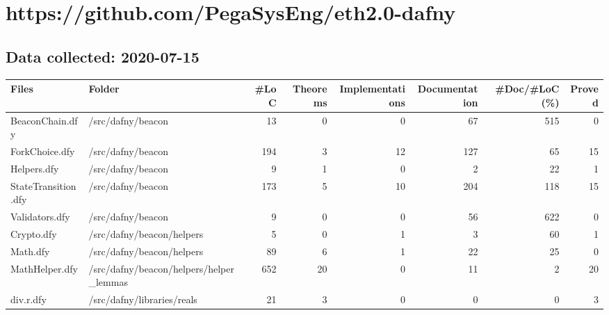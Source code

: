 \documentclass[a4paper, 12pt]{article}
\begin{document}
\section*{https://github.com/PegaSysEng/eth2.0-dafny}
\subsection*{Data collected: 2020-07-15}
\scriptsize
\begin{tabular}{llrrrrrr}
\toprule
                           Files &                                          Folder &  \#LoC &  Theorems &  Implementations &  Documentation &  \#Doc/\#LoC (\%) &  Proved \\
\midrule
                 BeaconChain.dfy &                               /src/dafny/beacon &    13 &         0 &                0 &             67 &            515 &       0 \\
                  ForkChoice.dfy &                               /src/dafny/beacon &   194 &         3 &               12 &            127 &             65 &      15 \\
                     Helpers.dfy &                               /src/dafny/beacon &     9 &         1 &                0 &              2 &             22 &       1 \\
             StateTransition.dfy &                               /src/dafny/beacon &   173 &         5 &               10 &            204 &            118 &      15 \\
                  Validators.dfy &                               /src/dafny/beacon &     9 &         0 &                0 &             56 &            622 &       0 \\
                      Crypto.dfy &                       /src/dafny/beacon/helpers &     5 &         0 &                1 &              3 &             60 &       1 \\
                        Math.dfy &                       /src/dafny/beacon/helpers &    89 &         6 &                1 &             22 &             25 &       0 \\
                  MathHelper.dfy &         /src/dafny/beacon/helpers/helper\_lemmas &   652 &        20 &                0 &             11 &              2 &      20 \\
                       div.r.dfy &                      /src/dafny/libraries/reals &    21 &         3 &                0 &              0 &              0 &       3 \\

\end{tabular}
\end{document}
